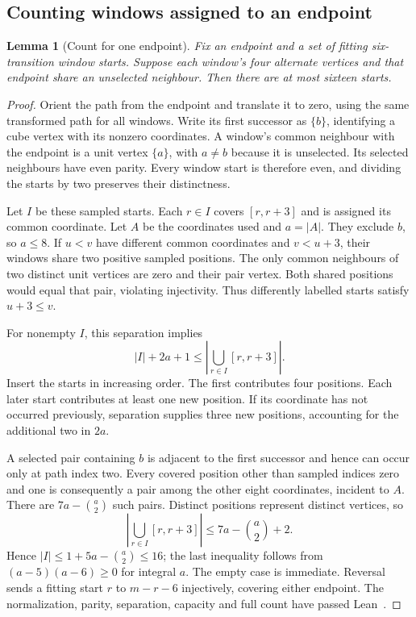 \documentclass[11pt,a4paper]{article}
\newtheorem{lemma}[theorem]{Lemma}
\theoremstyle{definition}
\theoremstyle{remark}
\begin{document}
\subsection{Counting windows assigned to an endpoint}\label{sec:endpoint-occurrences}
\begin{lemma}[Count for one endpoint]\label{lem:sixteen-endpoint-windows}
Fix an endpoint and a set of fitting six-transition window starts. Suppose
each window's four alternate vertices and that endpoint share an unselected
neighbour. Then there are at most sixteen starts.
\end{lemma}
\begin{proof}
Orient the path from the endpoint and translate it to zero, using the same
transformed path for all windows. Write its first successor as $\{b\}$,
identifying a cube vertex with its nonzero coordinates. A window's common
neighbour with the endpoint is a unit vertex $\{a\}$, with $a\ne b$
because it is unselected. Its selected neighbours have even parity. Every
window start is therefore even, and dividing the starts by two preserves
their distinctness.

Let $I$ be these sampled starts. Each $r\in I$ covers $[r,r+3]$ and is
assigned its common coordinate. Let $A$ be the coordinates used and $a=|A|$.
They exclude $b$, so $a\le8$. If $u<v$ have different common coordinates
and $v<u+3$, their windows share two positive sampled positions. The only
common neighbours of two distinct unit vertices are zero and their pair
vertex. Both shared positions would equal that pair, violating injectivity.
Thus differently labelled starts satisfy $u+3\le v$.

For nonempty $I$, this separation implies
\[
|I|+2a+1\le\left|\bigcup_{r\in I}[r,r+3]\right|.
\]
Insert the starts in increasing order. The first contributes four positions.
Each later start contributes at least one new position. If its coordinate
has not occurred previously, separation supplies three new positions,
accounting for the additional two in $2a$.

A selected pair containing $b$ is adjacent to the first successor and hence
can occur only at path index two. Every covered position other than sampled
indices zero and one is consequently a pair among the other eight coordinates,
incident to $A$. There are $7a-\binom a2$ such pairs. Distinct positions
represent distinct vertices, so
\[
\left|\bigcup_{r\in I}[r,r+3]\right|\le7a-\binom a2+2.
\]
Hence $|I|\le1+5a-\binom a2\le16$; the last inequality follows from
$(a-5)(a-6)\ge0$ for integral $a$. The empty case is immediate.
Reversal sends a fitting start $r$ to $m-r-6$ injectively, covering either
endpoint. The normalization, parity, separation, capacity and full count
have passed Lean~\cite{occurrencearchive}.
\end{proof}
\end{document}
